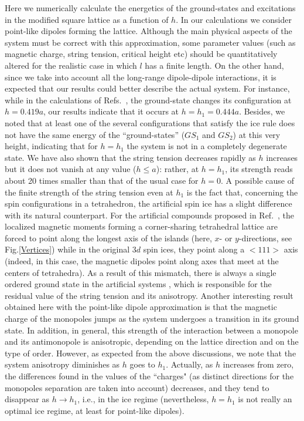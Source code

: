 \documentclass[aps,prb,twocolumn,floatfix,showpacs,amsmath,amssymb]{revtex4}
\begin{document}
Here we numerically calculate the energetics of the ground-states
and excitations in the modified square lattice as a function of
$h$. In our calculations we consider point-like dipoles forming
the lattice. Although the main physical aspects of  the system
must be correct with this approximation, some parameter values
(such as magnetic charge, string tension, critical height etc)
should be quantitatively altered for the realistic case in which
$l$ has a finite length. On the other hand, since we take into
account all the long-range dipole-dipole interactions, it is
expected that our results could better describe the actual system. For
instance, while in the calculations of
Refs.~, the ground-state changes its
configuration at $h=0.419a$, our results indicate that it occurs
at $h=h_1=0.444a$. Besides, we noted that at least one of the several
configurations that satisfy the ice rule does not have the same
energy of the ``ground-states'' ($GS_1$ and $GS_2$) at this very
height, indicating that for $h=h_1$ the system is not in a completely
degenerate state.
We have also shown that the string tension
decreases rapidly as $h$ increases but it does not vanish at any
value ($h\leq a$): rather, at $h=h_1$, its strength reads about 20
times smaller than that of the usual case for $h=0$. A
possible cause of the finite strength of the string tension even
at $h_{1}$ is the fact that, concerning the spin configurations in
a tetrahedron, the artificial spin ice has a slight difference
with its natural counterpart. For the artificial compounds
proposed in Ref.~, the localized magnetic
moments forming a corner-sharing tetrahedral lattice are forced to
point along the longest axis of the islands (here, $x$- or
$y$-directions, see Fig.\ref{Vertices}) while in the original $3d$
spin ices, they point along a $<111>$ axis (indeed, in this case,
the magnetic dipoles point along axes that meet at the centers of
tetrahedra). As a result of this mismatch, there is always a
single ordered ground state in the artificial systems
, which is
responsible for the residual value of the string tension and its
anisotropy.
Another interesting result obtained here with the
point-like dipole approximation is that the magnetic charge of the
monopoles jumps as the system undergoes a transition in its ground
state. In addition, in general, this strength of the interaction
between a monopole and its antimonopole is anisotropic, depending
on the lattice direction and on the type of order. However, as
expected from the above discussions, we note that the system
anisotropy diminishes as $h$ goes to $h_{1}$. Actually, as $h$
increases from zero, the differences found in the values of the
``charges" (as distinct directions for the monopoles separation
are taken into account) decreases, and they tend to disappear as
$h\rightarrow h_{1}$, i.e., in the ice regime (nevertheless,
$h=h_{1}$ is not really an optimal ice regime, at least for
point-like dipoles).
\end{document}
